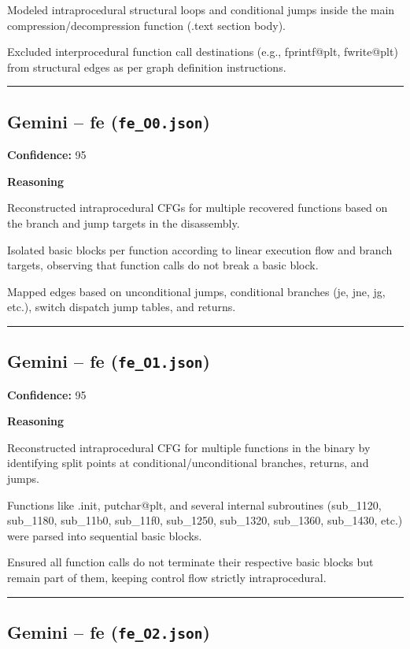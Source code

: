 Modeled intraprocedural structural loops and conditional jumps inside the main compression/decompression function (.text section body).

Excluded interprocedural function call destinations (e.g., fprintf@plt, fwrite@plt) from structural edges as per graph definition instructions.

\bigskip
\hrule
\bigskip

\subsection{Gemini -- fe (\texttt{fe\_O0.json})}

\textbf{Confidence:} 95

\textbf{Reasoning}

Reconstructed intraprocedural CFGs for multiple recovered functions based on the branch and jump targets in the disassembly.

Isolated basic blocks per function according to linear execution flow and branch targets, observing that function calls do not break a basic block.

Mapped edges based on unconditional jumps, conditional branches (je, jne, jg, etc.), switch dispatch jump tables, and returns.

\bigskip
\hrule
\bigskip

\subsection{Gemini -- fe (\texttt{fe\_O1.json})}

\textbf{Confidence:} 95

\textbf{Reasoning}

Reconstructed intraprocedural CFG for multiple functions in the binary by identifying split points at conditional/unconditional branches, returns, and jumps.

Functions like .init, putchar@plt, and several internal subroutines (sub\_1120, sub\_1180, sub\_11b0, sub\_11f0, sub\_1250, sub\_1320, sub\_1360, sub\_1430, etc.) were parsed into sequential basic blocks.

Ensured all function calls do not terminate their respective basic blocks but remain part of them, keeping control flow strictly intraprocedural.

\bigskip
\hrule
\bigskip

\subsection{Gemini -- fe (\texttt{fe\_O2.json})}

